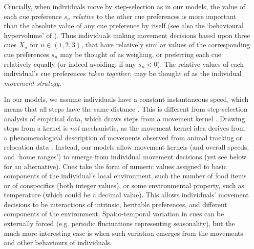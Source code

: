 Crucially, when individuals move by step-selection as in our models, the value of each cue preference $s_{n}$ \textit{relative} to the other cue preferences is more important than the absolute value of any cue preference by itself (see also the `behavioural hypervolume' of \cite{bastille-rousseau2019}).
Thus individuals making movement decisions based upon three cues $X_n$ for $n \in (1, 2, 3)$, that have relatively similar values of the corresponding cue preferences $s_n$ may be thought of as weighing, or preferring each cue relatively equally (or indeed avoiding, if any $s_n < 0$).
The relative values of each individual's cue preferences \textit{taken together}, may be thought of as the individual \textit{movement strategy}.

In our models, we assume individuals have a constant instantaneous speed, which means that all steps have the same distance \parencite[see a similar implementation in][]{spiegel2017}.
This is different from step-selection analysis of empirical data, which draws steps from a movement kernel \parencite{fortin2005,manly2002,avgar2016}.
Drawing steps from a kernel \parencite*[see e.g.][]{white2018} is \textit{not} mechanistic, as the movement kernel idea derives from a phenomenological description of movements observed from animal tracking or relocation data \parencite{fortin2005}.
Instead, our models allow movement kernels (and overall speeds, and `home ranges') to emerge from individual movement decisions (yet see below for an alternative).
Cues take the form of numeric values assigned to basic components of the individual's local environment, such the number of food items or of conspecifics (both integer values), or some environmental property, such as temperature (which could be a decimal value).
This allows individuals' movement decisions to be interactions of intrinsic, heritable preferences, and different components of the environment.
Spatio-temporal variation in cues can be externally forced (e.g. periodic fluctuations representing seasonality), but the much more interesting case is when such variation emerges from the movements and other behaviours of individuals.

